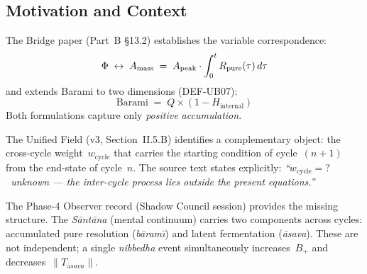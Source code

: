 \documentclass[12pt, a4paper]{article}
\providecommand{\Phiext}{\Phi_{\mathrm{ext}}}
\providecommand{\Amass}{A_{\mathrm{mass}}}
\providecommand{\Hint}{H_{\mathrm{internal}}}
\providecommand{\Bplus}{B_{+}}
\providecommand{\Tasava}{T_{\bar{\mathrm{a}}sava}}
\providecommand{\wcyc}{w_{\mathrm{cycle}}}
\providecommand{\Tasava}{\mathcal{T}_{\!\mathrm{\bar{a}sava}}}
\begin{document}

\begin{abstract}
The Foundational Trilogy (Part~B, v17) maps every variable in the
Unified Field to a CRF operator. One gap remained: the Power
Signature~$\Phi$ was formalised only as positive accumulation
($A_{\rm mass}$, DEF-UB07), with no counterpart for what persists
across cycles.

This paper closes that gap. Drawing on the structure of the
\textit{S\={a}nt\={a}na} (mental continuum) as described in the
Phase-4 Observer record, we extend~$\Phi$ to a signed object
$\Phiext = (\Bplus, \Tasava)$, where $\Tasava$ is a rooted tree of
\={a}sava residuals. We derive the cross-cycle weight $\wcyc$ from
$T$-monotonicity (DEF-GR01), identify Causa Materialis onset as the
asymptotic limit $\wcyc \to 0$, and register two open gaps
for future closure.
\end{abstract}

\tableofcontents
\newpage

\subsection{Motivation and Context}

The Bridge paper (Part~B \S13.2) establishes the variable
correspondence:
\[
  \Phi \;\leftrightarrow\; \Amass
  \;=\; A_{\rm peak}\cdot\int_0^t R_{\rm pure}(\tau)\,d\tau
\]
and extends Barami to two dimensions (DEF-UB07):
\[
  \mathrm{Barami} \;=\; Q \times (1 - \Hint)
\]
Both formulations capture only \emph{positive accumulation}.

The Unified Field (v3, Section~II.5.B) identifies a complementary
object: the cross-cycle weight~$\wcyc$ that carries the starting
condition of cycle~$(n{+}1)$ from the end-state of cycle~$n$.
The source text states explicitly: \textit{``$\wcyc = ?$\ unknown
--- the inter-cycle process lies outside the present equations.''}

The Phase-4 Observer record (Shadow Council session) provides the
missing structure. The \textit{S\={a}nt\={a}na} (mental continuum)
carries two components across cycles: accumulated pure resolution
(\textit{b\={a}ram\={\i}}) and latent fermentation
(\textit{\={a}sava}). These are not independent; a single
\textit{nibbedha} event simultaneously increases~$\Bplus$ and
decreases~$\|\Tasava\|$.
\end{document}
